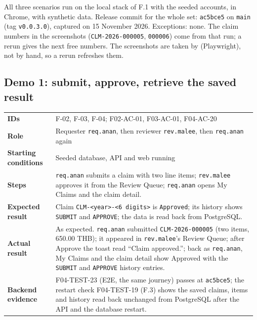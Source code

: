 \label{F:2}

All three scenarios run on the local stack of F.1 with the seeded accounts, in Chrome, with synthetic data.
Release commit for the whole set: \texttt{ac5bce5} on \texttt{main} (tag \texttt{v0.0.3.0}), captured on 15 November 2026.
Exceptions: none. The claim numbers in the screenshots (\texttt{CLM-2026-000005}, \texttt{000006}) come from that run; a rerun gives the next free numbers.
The screenshots are taken by  (Playwright), not by hand, so a rerun refreshes them.

\newcommand{\demofacts}[7]{%
  \begin{center}\small
  \begin{tabular}{@{}>{\bfseries}p{3.1cm}p{13.2cm}@{}}
  \toprule
  IDs & #1 \\
  Role & #2 \\
  Starting conditions & #3 \\
  Steps & #4 \\
  Expected result & #5 \\
  Actual result & #6 \\
  Backend evidence & #7 \\
  \bottomrule
  \end{tabular}
  \end{center}}

\subsection*{Demo 1: submit, approve, retrieve the saved result}

\demofacts
 {F-02, F-03, F-04; F02-AC-01, F03-AC-01, F04-AC-20}
 {Requester \texttt{req.anan}, then reviewer \texttt{rev.malee}, then \texttt{req.anan} again}
 {Seeded database, API and web running}
 {\texttt{req.anan} submits a claim with two line items; \texttt{rev.malee} approves it from the Review Queue; \texttt{req.anan} opens My Claims and the claim detail.}
 {Claim \texttt{CLM-<year>-<6 digits>} is \texttt{Approved}; its history shows \texttt{SUBMIT} and \texttt{APPROVE}; the data is read back from PostgreSQL.}
 {As expected. \texttt{req.anan} submitted \texttt{CLM-2026-000005} (two items, 650.00 THB); it appeared in \texttt{rev.malee}'s Review Queue; after Approve the toast read ``Claim approved.''; back as \texttt{req.anan}, My Claims and the claim detail show Approved with the \texttt{SUBMIT} and \texttt{APPROVE} history entries.}
 {F04-TEST-23 (E2E, the same journey) passes at \texttt{ac5bce5}; the restart check F04-TEST-19 (F.3) shows the saved claims, items and history read back unchanged from PostgreSQL after the API and the database restart.}

